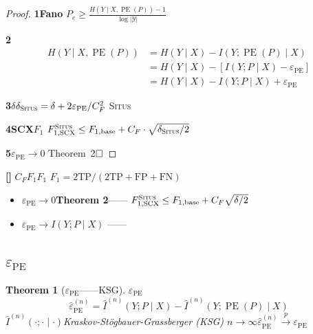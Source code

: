 \documentclass[11pt,a4paper]{article}
\newtheorem{theorem}{Theorem}[section]
\theoremstyle{remark}
\DeclareMathOperator{\PE}{PE}
\newcommand{\Y}{\mathcal{Y}}
\newcommand{\Situs}{\textsc{Situs}}
\newcommand{\rigorous}{\textnormal{\textbf{[]}}}
\begin{document}
\begin{proof}
\textbf{1Fano}
$P_e \geq \frac{H(Y \mid X, \PE(P)) - 1}{\log |\Y|}$

\textbf{2}
\begin{align}
    H(Y \mid X, \PE(P))
    &= H(Y \mid X) - I(Y; \PE(P) \mid X) \nonumber\\
    &= H(Y \mid X) - [I(Y; P \mid X) - \varepsilon_{\PE}] \nonumber\\
    &= H(Y \mid X) - I(Y; P \mid X) + \varepsilon_{\PE}
\end{align}

\textbf{3$\delta$}$\delta_{\Situs} = \delta + 2\varepsilon_{\PE}/C_F^2$
\Situs{}

\textbf{4SCX$F_1$}
$F_{1,\text{SCX}}^{\Situs} \leq F_{1,\text{base}} + C_F \cdot \sqrt{\delta_{\Situs}/2}$

\textbf{5}$\varepsilon_{\PE} \to 0$
Theorem~2$\hfill \square$
\end{proof}

\rigorous{} \textbf{}
$C_F$$F_1$$F_1$
$F_1 = 2\text{TP}/(2\text{TP} + \text{FP} + \text{FN})$


\textbf{}
\begin{itemize}
    \item $\varepsilon_{\PE} \to 0$\textbf{Theorem 2}——
          $F_{1,\text{SCX}}^{\Situs} \leq F_{1,\text{base}} + C_F\sqrt{\delta/2}$
    \item $\varepsilon_{\PE} \to I(Y; P \mid X)$
          ——\textbf{}
\end{itemize}

\subsection{$\varepsilon_{\PE}$}

\begin{theorem}[$\varepsilon_{\PE}$——KSG]
\label{thm:3.3.1}
$\varepsilon_{\PE}$\textbf{}
\begin{equation}
    \boxed{
    \hat{\varepsilon}_{\PE}^{(n)} = \hat{I}^{(n)}(Y; P \mid X)
                                 - \hat{I}^{(n)}(Y; \PE(P) \mid X)
    }
\end{equation}
$\hat{I}^{(n)}(\cdot; \cdot \mid \cdot)$Kraskov-St\"{o}gbauer-Grassberger (KSG)
$n \to \infty$$\hat{\varepsilon}_{\PE}^{(n)} \xrightarrow{p} \varepsilon_{\PE}$
\end{theorem}
\end{document}
